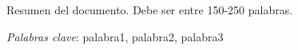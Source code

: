 Resumen del documento. Debe ser entre 150-250 palabras.

\textit{Palabras clave}: palabra1, palabra2, palabra3